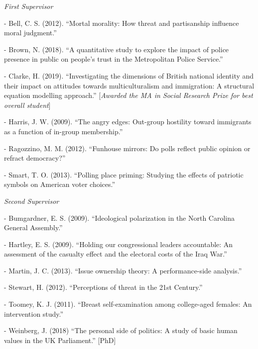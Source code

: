\documentclass[12pt]{article}
\newcommand{\halfblankline}{\quad\vspace{-0.5\baselineskip}\pagebreak[3]}
\begin{document}
\emph{First Supervisor}
\begin{innerlist}
	\item[-] Bell, C. S. (2012). ``Mortal morality: 
                How threat and partisanship influence moral judgment.''
	\item[-] Brown, N. (2018). ``A quantitative study to explore the impact of police 
					presence in public on people's trust in the Metropolitan Police Service.''

	\item[-] Clarke, H. (2019). ``Investigating the dimensions of British national identity and their impact on attitudes towards multiculturalism and immigration: A structural equation modelling approach.'' [\textit{Awarded the MA in Social Research Prize for best overall student}]
                
	\item[-] Harris, J. W. (2009). ``The angry edges: Out-group
                         hostility toward immigrants as a function of in-group membership.''
	\item[-] Ragozzino, M. M. (2012). ``Funhouse mirrors: Do polls 
                        reflect public opinion or refract democracy?''
                        
	\item[-] Smart, T. O. (2013). ``Polling place priming: 
                Studying the effects of patriotic symbols on American voter choices.''
\end{innerlist}

\halfblankline

\emph{Second Supervisor}
\begin{innerlist}
	\item[-] Bumgardner, E. S. (2009). ``Ideological polarization in the 
                North Carolina General Assembly.''
    
    \item[-] Hartley, E. S. (2009). ``Holding our congressional 
                leaders accountable: An assessment of the casualty 
                effect and the electoral costs of the Iraq War.''


                
    \item[-] Martin, J. C. (2013). ``Issue ownership theory: A performance-side analysis.''

	\item[-] Stewart, H. (2012). ``Perceptions of threat in the 21st Century.''
	
	\item[-] Toomey, K. J. (2011). ``Breast self-examination among college-aged females: 
                An intervention study.''
                
	\item[-] Weinberg, J. (2018) ``The personal side of politics: A study 
				of basic human values in the UK Parliament.'' [PhD]
\end{innerlist}
\end{document}
